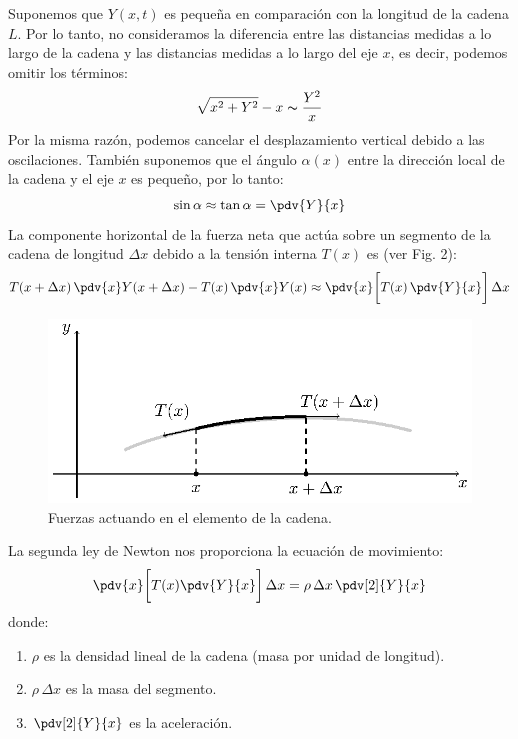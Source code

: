 Suponemos que $Y (x, t)$ es pequeña en comparación con la longitud de la cadena $L$. Por lo tanto, no consideramos  la diferencia entre las distancias medidas a lo largo de la cadena y las distancias medidas a lo largo del eje $x$, es decir, podemos omitir los términos:
\begin{align*}
\sqrt{x^{2} + Y^{2}} - x \thicksim \dfrac{Y^{2}}{x}
\end{align*}
Por la misma razón, podemos cancelar el desplazamiento vertical debido a las oscilaciones. También suponemos que el ángulo $\alpha (x)$ entre la dirección local de la cadena y el eje $x$ es pequeño, por lo tanto:
\begin{align}
\sin \alpha \approx \tan \alpha = \pdv{Y}{x}
\label{eq:ecuacion_01}
\end{align}
La componente horizontal de la fuerza neta que actúa sobre un segmento de la cadena de longitud $\Delta x$ debido a la tensión interna $T (x)$ es (ver Fig. 2):
\begin{align}
T (x  + \Delta x) \, \pdv{x} Y (x + \Delta x) - T (x) \, \pdv{x} Y (x) \approx \pdv{x} \bigg[ T (x) \, \pdv{Y}{x}  \bigg] \, \Delta x
\label{eq:ecuacion_02}
\end{align}

\begin{figure}[H]
    \centering
    \includegraphics[scale=1.3]{Imagenes/Cadena_Oscilante_02.eps}
    \caption{Fuerzas actuando en el elemento de la cadena.}
    \label{fig:figura_elemento_cadena}
\end{figure}

La segunda ley de Newton nos proporciona la ecuación de movimiento:
\begin{align}
\pdv{x} \bigg[ T (x) \pdv{Y}{x} \bigg] \, \Delta x = \rho \, \Delta x \, \pdv[2]{Y}{x}
\label{eq:ecuacion_03}
\end{align}
donde:
\begin{enumerate}[label=\alph*)]
\item $\rho$ es la densidad lineal de la cadena (masa por unidad de longitud).
\item $\rho \, \Delta x$  es la masa del segmento.
\item $\displaystyle \pdv[2]{Y}{x}$ es la aceleración.
\end{enumerate}

